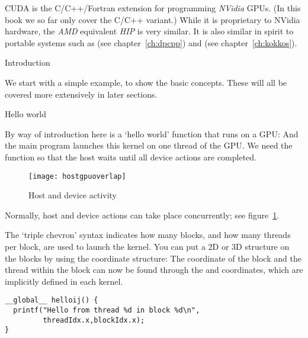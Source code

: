 
\lstset{language=cuda}
\acf{CUDA} is the C/C++/Fortran extension for programming
\emph{NVidia} \acp{GPU}.
(In this book we so far only cover the C/C++ variant.)
While it is proprietary to NVidia hardware,
the \emph{AMD} equivalent \emph{HIP} is very similar.
It is also similar in spirit to portable systems
such as  (see chapter~\ref{ch:dpcpp})
and  (see chapter~\ref{ch:kokkos}).

 {Introduction}

We start with a simple example, to show the basic concepts.
These will all be covered more extensively in later sections.

 {Hello world}

By way of introduction here is a 
`hello world' function that runs on a GPU:
And the main program launches this kernel on one thread of the \ac{GPU}.
We need the  function so that the host waits
until all device actions are completed.
\begin{figure}[ht]
  \texttt{[image: hostgpuoverlap]}
  \caption{Host and device activity}
  \label{fig:hostgpuoverlap}
\end{figure}
Normally, host and device actions can take place concurrently;
see figure~\ref{fig:hostgpuoverlap}.

The `triple chevron' syntax indicates how many blocks, and how many threads per block,
are used to launch the kernel.
You can put a 2D or 3D structure on the blocks by using the 
coordinate structure:
The coordinate of the block and the thread within the block can now be
found through the  and 
coordinates, which are implicitly defined in each kernel.
\begin{lstlisting}
__global__ helloij() {
  printf("Hello from thread %d in block %d\n",
         threadIdx.x,blockIdx.x);
}
\end{lstlisting}

